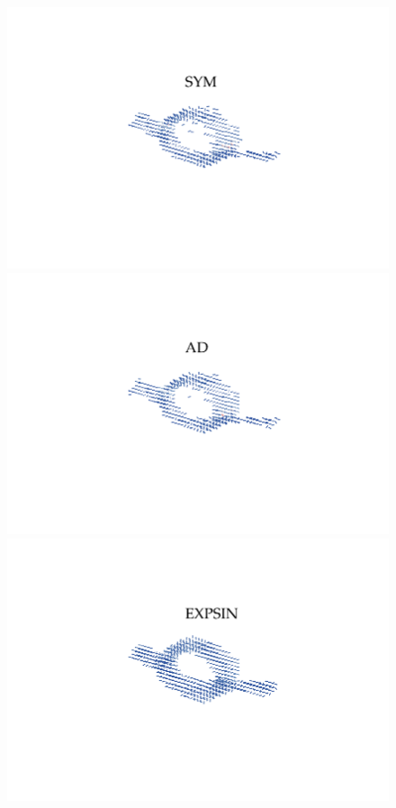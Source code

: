 \begin{figure}[h!]
    \centering

    \includegraphics[trim={2.5cm 2.5cm 2.5cm 2.5cm},clip, width = 1\textwidth]{./svg-inkscape/ck_indSYM_svg-tex.pdf}
    \includegraphics[trim={2.5cm 2.5cm 2.5cm 2.5cm},clip, width = 1\textwidth]{./svg-inkscape/ck_indAD_svg-tex.pdf}
    \includegraphics[trim={2.5cm 2.5cm 2.5cm 2.5cm},clip, width = 1\textwidth]{./svg-inkscape/ck_indEXPSIN_svg-tex.pdf}

\end{figure}
